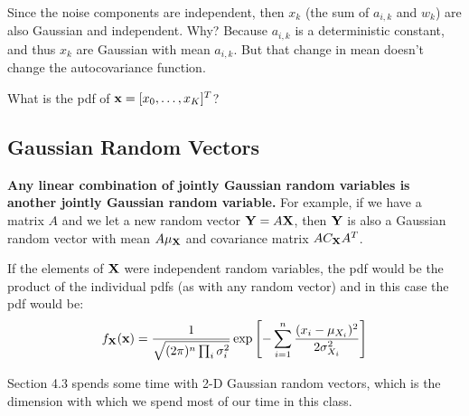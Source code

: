 Since the noise components are independent, then $x_k$ (the sum of $a_{i,k}$ and $w_k$) are also
Gaussian and independent. Why? Because $a_{i,k}$ is a deterministic constant, and thus $x_k$ are Gaussian with mean $a_{i,k}$.  But that change in mean doesn't change the autocovariance function. 

What is the pdf of $\mathbf{x} = [x_0, \ldots, x_K]^T$?


\subsection{Gaussian Random Vectors}


\textbf{Any linear combination of jointly Gaussian random variables
is another jointly Gaussian random variable.}  For example, if we
have a matrix $A$ and we let a new random vector $\mathbf{Y} = A \mathbf{X}$,
then $\mathbf{Y}$ is also a Gaussian random vector with mean $A\mu_{\mathbf{X}}$
and covariance matrix $A C_{\mathbf{X}} A^T$.

If the elements of $\mathbf{X}$ were independent random variables, the pdf
would be the product of the individual pdfs (as with any random
vector) and in this case the pdf would be:
\[
f_{\mathbf{X}}(\mathbf{x}) = \frac{1}{\sqrt{(2\pi)^n \prod_i \sigma_i^2}}
  \exp \left[ -\sum_{i=1}^n \frac{(x_i-\mu_{X_i})^2}{2\sigma_{X_i}^2}  \right]
\]

Section 4.3 spends some time with 2-D Gaussian random vectors, which
is the dimension with which we spend most of our time in this class.
